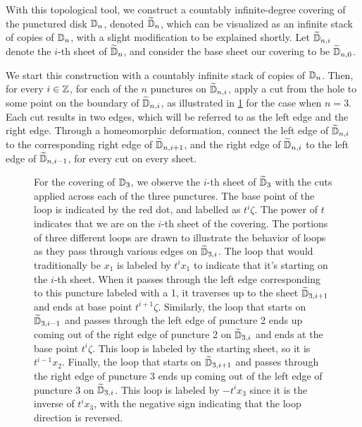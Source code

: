 With this topological tool, we construct a countably infinite-degree covering of the punctured disk $\mathbb{D}_n$, denoted $\widetilde{\mathbb{D}}_n$, which can be visualized as an infinite stack of copies of $\mathbb{D}_n$, with a slight modification to be explained shortly. Let $\widetilde{\mathbb{D}}_{n,i}$ denote the $i$-th sheet of $\widetilde{\mathbb{D}}_n$, and consider the base sheet our covering to be $\widetilde{\mathbb{D}}_{n,0}$.

We start this construction with a countably infinite stack of copies of $\mathbb{D}_n$. Then, for every $i\in\mathbb{Z}$, for each of the $n$ punctures on $\widetilde{\mathbb{D}}_{n,i}$, apply a cut from the hole to some point on the boundary of $\widetilde{\mathbb{D}}_{n,i}$, as illustrated in \cref{fig:D3_cuts} for the case when $n=3$. Each cut results in two edges, which will be referred to as the left edge and the right edge. Through a homeomorphic deformation, connect the left edge of $\widetilde{\mathbb{D}}_{n,i}$ to the corresponding right edge of $\widetilde{\mathbb{D}}_{n,i+1}$, and the right edge of $\widetilde{\mathbb{D}}_{n,i}$ to the left edge of $\widetilde{\mathbb{D}}_{n,i-1}$, for every cut on every sheet.

\begin{figure}[htbp]
    \centering
    
    \caption{
        For the covering of $\mathbb{D}_3$, we observe the $i$-th sheet of $\widetilde{\mathbb{D}}_3$ with the cuts applied across each of the three punctures. The base point of the loop is indicated by the red dot, and labelled as $t^i\zeta$. The power of $t$ indicates that we are on the $i$-th sheet of the covering. The portions of three different loops are drawn to illustrate the behavior of loops as they pass through various edges on $\widetilde{\mathbb{D}}_{3,i}$. The loop that would traditionally be $x_1$ is labeled by $t^i x_1$ to indicate that it's starting on the $i$-th sheet. When it passes through the left edge corresponding to this puncture labeled with a 1, it traverses up to the sheet $\widetilde{\mathbb{D}}_{3,i+1}$ and ends at base point $t^{i+1}\zeta$. Similarly, the loop that starts on $\widetilde{\mathbb{D}}_{3,i-1}$ and passes through the left edge of puncture 2 ends up coming out of the right edge of puncture 2 on $\widetilde{\mathbb{D}}_{3,i}$ and ends at the base point $t^i\zeta$. This loop is labeled by the starting sheet, so it is $t^{i-1}x_2$. Finally, the loop that starts on $\widetilde{\mathbb{D}}_{3,i+1}$ and passes through the right edge of puncture 3 ends up coming out of the left edge of puncture 3 on $\widetilde{\mathbb{D}}_{3,i}$. This loop is labeled by $-t^{i}x_3$ since it is the inverse of $t^i x_3$, with the negative sign indicating that the loop direction is reversed.
    }\label{fig:D3_cuts}
\end{figure}

